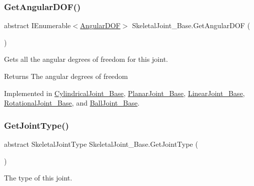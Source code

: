 \subsubsection{\texorpdfstring{Get\+Angular\+D\+O\+F()}{GetAngularDOF()}}
{\footnotesize\ttfamily abstract I\+Enumerable$<$\hyperlink{interface_angular_d_o_f}{Angular\+D\+OF}$>$ Skeletal\+Joint\+\_\+\+Base.\+Get\+Angular\+D\+OF (\begin{DoxyParamCaption}{ }\end{DoxyParamCaption})\hspace{0.3cm}{\ttfamily [pure virtual]}}



Gets all the angular degrees of freedom for this joint. 

\begin{DoxyReturn}{Returns}
The angular degrees of freedom
\end{DoxyReturn}


Implemented in \hyperlink{class_cylindrical_joint___base_a9eba59edd9ac877a3be28e652b364b59}{Cylindrical\+Joint\+\_\+\+Base}, \hyperlink{class_planar_joint___base_ad773d6e627d22530181faf6d8654161a}{Planar\+Joint\+\_\+\+Base}, \hyperlink{class_linear_joint___base_a4f814a5b27b53d3d01ad39adbcd2b0bf}{Linear\+Joint\+\_\+\+Base}, \hyperlink{class_rotational_joint___base_aead83dd768acf451c3761f49e393cc35}{Rotational\+Joint\+\_\+\+Base}, and \hyperlink{class_ball_joint___base_a9bf9eac2eee14ae92bb723aabf60caa9}{Ball\+Joint\+\_\+\+Base}.

\mbox{\label{class_skeletal_joint___base_aee155cbd483cb512bf3fc0f9a8885335}} 
\subsubsection{\texorpdfstring{Get\+Joint\+Type()}{GetJointType()}}
{\footnotesize\ttfamily abstract Skeletal\+Joint\+Type Skeletal\+Joint\+\_\+\+Base.\+Get\+Joint\+Type (\begin{DoxyParamCaption}{ }\end{DoxyParamCaption})\hspace{0.3cm}{\ttfamily [pure virtual]}}



The type of this joint. 


